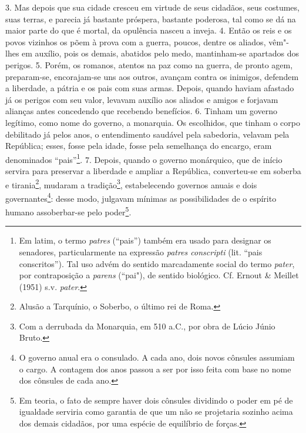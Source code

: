3. Mas depois que sua cidade cresceu em virtude de seus cidadãos, seus
costumes, suas terras, e parecia já bastante próspera, bastante poderosa, tal
como se dá na maior parte do que é mortal, da opulência nasceu a inveja. 4.
Então os reis e os povos vizinhos os põem à prova com a guerra, poucos, dentre
os aliados, vêm"-lhes em auxílio, pois os demais, abatidos pelo medo,
mantinham-se apartados dos perigos. 5. Porém, os romanos, atentos na paz como
na guerra, de pronto agem, preparam-se, encorajam-se uns aos outros, 
avançam contra %
os inimigos, defendem a liberdade, a pátria e os pais com suas armas.
Depois, quando haviam afastado já os perigos com seu valor, levavam auxílio aos
aliados e amigos e forjavam alianças antes concedendo que recebendo benefícios.
6. Tinham um governo legítimo, como nome do governo, a monarquia. Os
escolhidos, que tinham o corpo debilitado já pelos anos, o entendimento
saudável pela sabedoria, velavam pela República; esses, fosse pela idade, fosse
pela semelhança do encargo, eram denominados “pais”\footnote{Em latim, o termo \emph{patres} (``pais'') também era usado para designar os senadores, particularmente na expressão \emph{patres conscripti} (lit. ``pais conscritos''). Tal uso advém do sentido marcadamente social do termo \emph{pater}, por contraposição a \emph{parens} (``pai"), de sentido biológico. Cf. Ernout \& Meillet (1951) s.v. \emph{pater}.}. 7. Depois, quando o
governo monárquico, que de início servira para preservar a liberdade e ampliar
a República, converteu-se em soberba e tirania\footnote{Alusão a Tarquínio, o
Soberbo, o último rei de Roma.}, mudaram a tradição\footnote{Com a derrubada da
Monarquia, em 510 a.C., por obra de Lúcio Júnio  Bruto.}, estabelecendo
governos anuais e dois governantes\footnote{O governo anual era o consulado. A
cada ano, dois novos cônsules assumiam o cargo. A contagem dos anos passou a
ser por isso feita com base no nome dos cônsules de cada ano.}: desse modo,
julgavam mínimas as possibilidades de o espírito humano assoberbar-se pelo
poder\footnote{Em teoria, o fato de sempre haver dois cônsules dividindo  o
poder em pé de igualdade serviria como garantia de que um não se projetaria
sozinho acima dos demais cidadãos, por uma espécie de equilíbrio de forças.}.

